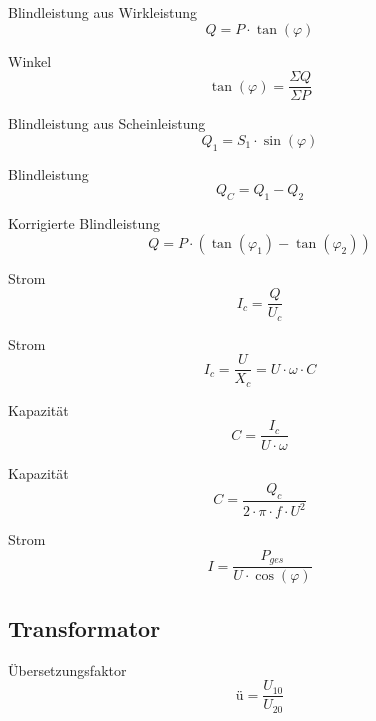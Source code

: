 \documentclass[11pt, a4paper, final, fleqn, twocolumn]{article}
\numberwithin{equation}{subsection}
\begin{document}
\noindent Blindleistung aus Wirkleistung
\begin{equation}
    Q = P \cdot \tan(\varphi)
\end{equation}

\noindent Winkel
\begin{equation}
    \tan(\varphi) = \frac{\Sigma Q}{\Sigma P}
\end{equation}

\noindent Blindleistung aus Scheinleistung
\begin{equation}
    Q_1 = S_1 \cdot \sin(\varphi)
\end{equation}

\noindent Blindleistung
\begin{equation}
    Q_C = Q_1 - Q_2
\end{equation}

\noindent Korrigierte Blindleistung
\begin{equation}
    Q = P \cdot (\tan(\varphi_1) - \tan(\varphi_2))
\end{equation}

\noindent Strom
\begin{equation}
    I_c = \frac{Q}{U_c}
\end{equation}

\noindent Strom
\begin{equation}
    I_c = \frac{U}{X_c} = U \cdot \omega \cdot C
\end{equation}

\noindent Kapazität
\begin{equation}
    C = \frac{I_c}{U \cdot \omega}
\end{equation}

\noindent Kapazität
\begin{equation}
    C = \frac{Q_c}{2 \cdot \pi \cdot f \cdot U^2}
\end{equation}

\noindent Strom
\begin{equation}
    I = \frac{P_{ges}}{U \cdot \cos(\varphi)}
\end{equation}


\subsection{Transformator}

Übersetzungsfaktor
\begin{equation}
    \text{ü} = \frac{U_{10}}{U_{20}}
\end{equation}
\end{document}
